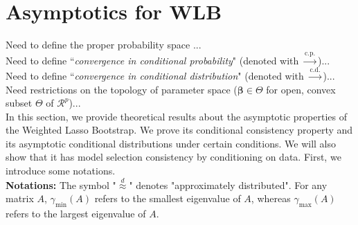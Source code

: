 \documentclass[12pt]{article}
\newcommand{\be}{\bm{\beta}} %
\newcommand{\CONV}[1]{\stackrel{\text{#1}}{\longrightarrow}} %
\begin{document}
\section{Asymptotics for WLB}

Need to define the proper probability space \citep{newton1991}... \\
Need to define ``\textit{convergence in conditional probability}" (denoted with $\CONV{c.p.}$)... \\
Need to define ``\textit{convergence in conditional distribution}" (denoted with $\CONV{c.d.}$)... \\
Need restrictions on the topology of parameter space ($\be \in \Theta$ for open, convex subset $\Theta$ of $\mathcal{R}^p$)...\\

In this section, we provide theoretical results about the asymptotic properties of the Weighted Lasso Bootstrap. We prove its conditional consistency property and its asymptotic conditional distributions under certain conditions. We will also show that it has model selection consistency by conditioning on data. First, we introduce some notations. \\

\textbf{Notations:} The symbol "$\stackrel{d}{\approx}$" denotes "approximately distributed". For any matrix $A$, $\gamma_{\text{min}} (A)$ refers to the smallest eigenvalue of $A$, whereas $\gamma_{\text{max}} (A)$ refers to the largest eigenvalue of $A$. \\
\end{document}
